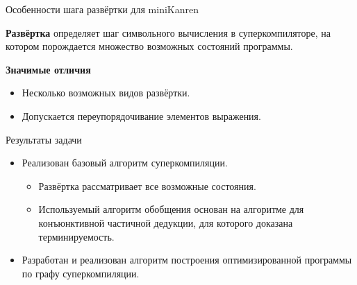 \documentclass[xcolor=table]{beamer}
\begin{document}
\begin{frame}{Особенности шага развёртки для miniKanren}
\begin{block}{}
{\bf Развёртка} определяет шаг символьного вычисления в суперкомпиляторе,
на котором порождается множество возможных состояний программы.
\end{block}
\vspace{0.5cm}
\begin{block}
{\bf Значимые отличия}
\begin{itemize}
\item Несколько возможных видов развёртки.
\item Допускается переупорядочивание элементов выражения.
\end{itemize}
\end{block}
\end{frame}

\begin{frame}{Результаты задачи}
\begin{itemize}
\item Реализован базовый алгоритм суперкомпиляции.
\begin{itemize}
\item Развёртка рассматривает все возможные состояния.
\item Используемый алгоритм обобщения основан на алгоритме для конъюнктивной частичной дедукции,
      для которого доказана терминируемость.
\end{itemize}
\item Разработан и реализован алгоритм построения оптимизированной программы по графу суперкомпиляции.
\end{itemize}
\end{frame}
\end{document}
